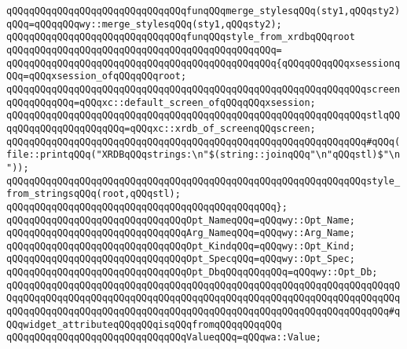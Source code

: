 \verb|qQQqqQQqqQQqqQQqqQQqqQQqqQQqqQQqfunqQQqmerge_stylesqQQq(sty1,qQQqsty2)qQQq=qQQqqQQqwy::merge_stylesqQQq(sty1,qQQqsty2);|\newline
\newline
\verb|qQQqqQQqqQQqqQQqqQQqqQQqqQQqqQQqfunqQQqstyle_from_xrdbqQQqroot|\newline
\verb|qQQqqQQqqQQqqQQqqQQqqQQqqQQqqQQqqQQqqQQqqQQqqQQq=|\newline
\verb|qQQqqQQqqQQqqQQqqQQqqQQqqQQqqQQqqQQqqQQqqQQqqQQq{qQQqqQQqqQQqxsessionqQQq=qQQqxsession_ofqQQqqQQqroot;|\newline
\verb|qQQqqQQqqQQqqQQqqQQqqQQqqQQqqQQqqQQqqQQqqQQqqQQqqQQqqQQqqQQqqQQqscreenqQQqqQQqqQQq=qQQqxc::default_screen_ofqQQqqQQqxsession;|\newline
\verb|qQQqqQQqqQQqqQQqqQQqqQQqqQQqqQQqqQQqqQQqqQQqqQQqqQQqqQQqqQQqqQQqstlqQQqqQQqqQQqqQQqqQQqqQQq=qQQqxc::xrdb_of_screenqQQqscreen;|\newline
\newline
\verb|qQQqqQQqqQQqqQQqqQQqqQQqqQQqqQQqqQQqqQQqqQQqqQQqqQQqqQQqqQQqqQQq#qQQq(file::printqQQq("XRDBqQQqstrings:\n"$(string::joinqQQq"\n"qQQqstl)$"\n"));|\newline
\verb|qQQqqQQqqQQqqQQqqQQqqQQqqQQqqQQqqQQqqQQqqQQqqQQqqQQqqQQqqQQqqQQqstyle_from_stringsqQQq(root,qQQqstl);|\newline
\verb|qQQqqQQqqQQqqQQqqQQqqQQqqQQqqQQqqQQqqQQqqQQqqQQq};|\newline
\newline
\verb|qQQqqQQqqQQqqQQqqQQqqQQqqQQqqQQqOpt_NameqQQq=qQQqwy::Opt_Name;|\newline
\verb|qQQqqQQqqQQqqQQqqQQqqQQqqQQqqQQqArg_NameqQQq=qQQqwy::Arg_Name;|\newline
\verb|qQQqqQQqqQQqqQQqqQQqqQQqqQQqqQQqOpt_KindqQQq=qQQqwy::Opt_Kind;|\newline
\verb|qQQqqQQqqQQqqQQqqQQqqQQqqQQqqQQqOpt_SpecqQQq=qQQqwy::Opt_Spec;|\newline
\verb|qQQqqQQqqQQqqQQqqQQqqQQqqQQqqQQqOpt_DbqQQqqQQqqQQq=qQQqwy::Opt_Db;|\newline
\newline
\verb|qQQqqQQqqQQqqQQqqQQqqQQqqQQqqQQqqQQqqQQqqQQqqQQqqQQqqQQqqQQqqQQqqQQqqQQqqQQqqQQqqQQqqQQqqQQqqQQqqQQqqQQqqQQqqQQqqQQqqQQqqQQqqQQqqQQqqQQqqQQqqQQqqQQqqQQqqQQqqQQqqQQqqQQqqQQqqQQqqQQqqQQqqQQqqQQqqQQqqQQqqQQqqQQq#qQQqwidget_attributeqQQqqQQqisqQQqfromqQQqqQQqqQQq|\newline
\verb|qQQqqQQqqQQqqQQqqQQqqQQqqQQqqQQqValueqQQq=qQQqwa::Value;|\newline
